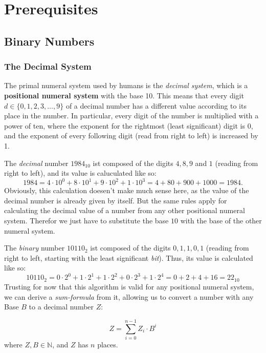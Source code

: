 \chapter{Prerequisites}

\section{Binary Numbers}

\subsection{The Decimal System}

The primal numeral system used by humans is the \emph{decimal system}, which is a \textbf{positional numeral system} with the base 10.
This means that every digit $d \in \{0,1,2,3,\ldots,9\}$ of a decimal number has a different value according to its place in the number.
In particular, every digit of the number is multiplied with a power of ten, where the exponent for the rightmost (least significant) digit is 0, and the exponent of every following digit (read from right to left) is increased by 1.

The \emph{decimal} number $1984_{10}$ ist composed of the digits $4,8,9$ and $1$ (reading from right to left), and its value is caluculated like so:
\begin{equation*}
1984=4\cdot10^0+8\cdot10^1+9\cdot10^2+1\cdot10^3=4+80+900+1000=1984.
\end{equation*}
Obviously, this calculation doesen't make much sense here, as the value of the decimal number is already given by itself.
But the same rules apply for calculating the decimal value of a number from any other positional numeral system.
Therefor we just have to substitute the base $10$ with the base of the other numeral system.

The \emph{binary} number $10110_2$ ist composed of the digits $0,1,1,0,1$ (reading from right to left, starting with the least significant \emph{bit}). 
Thus, its value is calculated like so:
\begin{equation*}
10110_2=0\cdot2^0+1\cdot2^1+1\cdot2^2+0\cdot2^3+1\cdot2^4=0+2+4+16=22_{10}
\end{equation*}
Trusting for now that this algorithm is valid for any positional numeral system, we can derive a \emph{sum-formula} from it, allowing us to convert a number with any Base $B$ to a decimal number $Z$:

\begin{equation} \label{eq:sum}
\boxed{Z=\sum_{i=0}^{n-1} Z_i \cdot B^i}
\end{equation}
where $Z,B \in \mathbb{N}$, and $Z$ has $n$ places.

